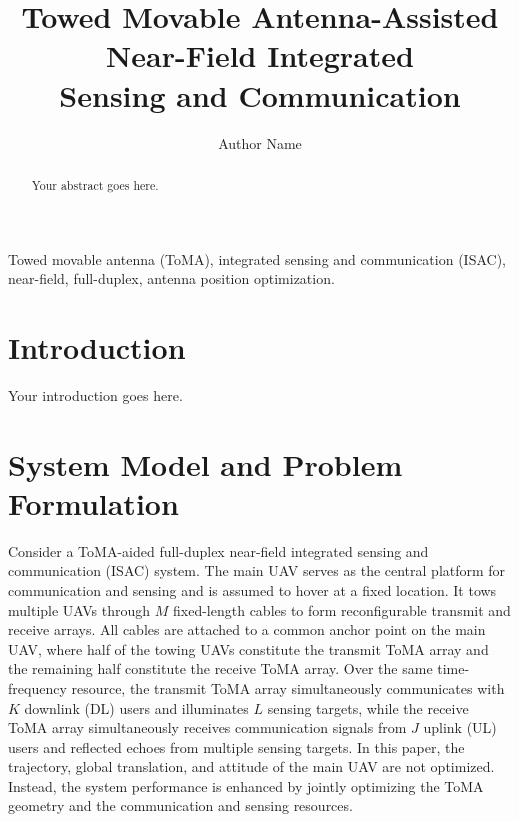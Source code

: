 \documentclass[letterpaper,journal]{IEEEtran}
\begin{document}
\title{Towed Movable Antenna-Assisted Near-Field Integrated\\ Sensing and Communication}

\author{Author Name}

\maketitle

\begin{abstract}
Your abstract goes here.
\end{abstract}

\begin{IEEEkeywords}
Towed movable antenna (ToMA), integrated sensing and communication (ISAC), near-field, full-duplex, antenna position optimization.
\end{IEEEkeywords}

\section{Introduction}
Your introduction goes here.

\section{System Model and Problem Formulation}
\label{sec:system_model}

Consider a ToMA-aided full-duplex near-field integrated sensing and communication (ISAC) system. The main UAV serves as the central platform for communication and sensing and is assumed to hover at a fixed location. It tows multiple UAVs through $M$ fixed-length cables to form reconfigurable transmit and receive arrays. All cables are attached to a common anchor point on the main UAV, where half of the towing UAVs constitute the transmit ToMA array and the remaining half constitute the receive ToMA array. Over the same time-frequency resource, the transmit ToMA array simultaneously communicates with $K$ downlink (DL) users and illuminates $L$ sensing targets, while the receive ToMA array simultaneously receives communication signals from $J$ uplink (UL) users and reflected echoes from multiple sensing targets. In this paper, the trajectory, global translation, and attitude of the main UAV are not optimized. Instead, the system performance is enhanced by jointly optimizing the ToMA geometry and the communication and sensing resources.
\end{document}
